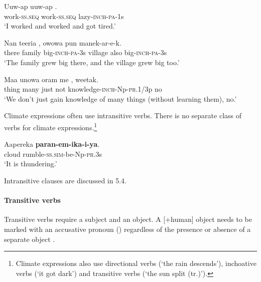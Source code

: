\ea%
\label{ex:x271}
\gll Uuw-ap uuw-ap . \\
work-\textsc{ss}.\textsc{seq} work-\textsc{ss}.\textsc{seq} lazy-\textsc{inch}-\textsc{pa}-1s \\
\glt`I worked and worked and got tired.'
\z

\ea%
\label{ex:x1486}
\gll Nan teeria , owowa pun manek-ar-e-k. \\
there family big-\textsc{inch}-\textsc{pa}-3s village also big-\textsc{inch}-\textsc{pa}-3s\\
\glt`The family grew big there, and the village grew big too.'
\z

\ea%
\label{ex:x1836}
\gll Maa unowa oram me \textstyleEmphasizedVernacularWords{-}\textstyleEmphasizedVernacularWords{-}\textstyleEmphasizedVernacularWords{-}, weetak. \\
thing many just not knowledge-\textsc{inch}-Np-\textsc{pr}.1/3p no\\
\glt`We don't just gain knowledge of many things (without learning them), no.'
\z

Climate expressions often use intransitive verbs. There is no separate class of verbs for climate expressions.\footnote{Climate expressions also use directional verbs (`the rain descends'), inchoative verbs (`it got dark') and transitive verbs (`the sun split (tr.)').}

\ea%
\label{ex:x270}
\gll Aapereka \textbf{paran-em-ika-i-ya}. \\
cloud rumble-\textsc{ss}.\textsc{sim}-be-Np-\textsc{pr}.3s\\
\glt`It is thundering.'
\z

Intransitive clauses are discussed in 5.4.

\paragraph[Transitive verbs]{Transitive verbs}
{}
Transitive verbs require a subject and an object. A [+human] object needs to be marked with an accusative pronoun () regardless of the presence or absence of a separate object . 

